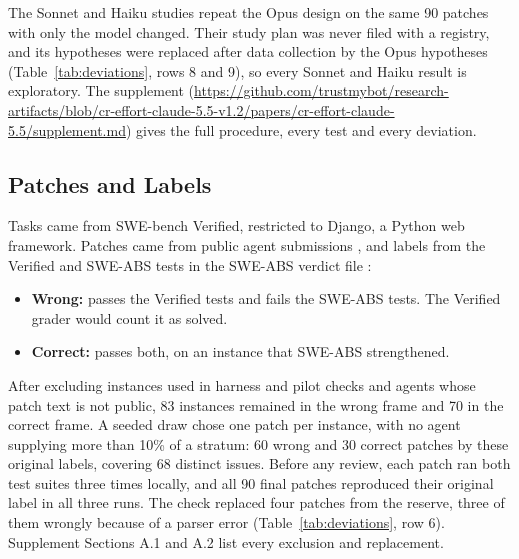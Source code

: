 \documentclass[sigconf,nonacm]{acmart}
\begin{document}
The Sonnet and Haiku studies repeat the Opus design on the same 90 patches with only the model changed. Their study plan was never filed with a registry, and its hypotheses were replaced after data collection by the Opus hypotheses (Table~\ref{tab:deviations}, rows 8 and 9), so every Sonnet and Haiku result is exploratory. The supplement (\url{https://github.com/trustmybot/research-artifacts/blob/cr-effort-claude-5.5-v1.2/papers/cr-effort-claude-5.5/supplement.md}) gives the full procedure, every test and every deviation.

\subsection{Patches and Labels}\label{sec:labels}

Tasks came from SWE-bench Verified, restricted to Django, a Python web framework. Patches came from public agent submissions \cite{swebench2026experiments}, and labels from the Verified and SWE-ABS tests in the SWE-ABS verdict file \cite{openagenteval2026sweabs}:

\begin{itemize}
\item \textbf{Wrong:} passes the Verified tests and fails the SWE-ABS tests. The Verified grader would count it as solved.
\item \textbf{Correct:} passes both, on an instance that SWE-ABS strengthened.
\end{itemize}

After excluding instances used in harness and pilot checks and agents whose patch text is not public, 83 instances remained in the wrong frame and 70 in the correct frame. A seeded draw chose one patch per instance, with no agent supplying more than 10\% of a stratum: 60 wrong and 30 correct patches by these original labels, covering 68 distinct issues. Before any review, each patch ran both test suites three times locally, and all 90 final patches reproduced their original label in all three runs. The check replaced four patches from the reserve, three of them wrongly because of a parser error (Table~\ref{tab:deviations}, row 6). Supplement Sections A.1 and A.2 list every exclusion and replacement.
\end{document}
